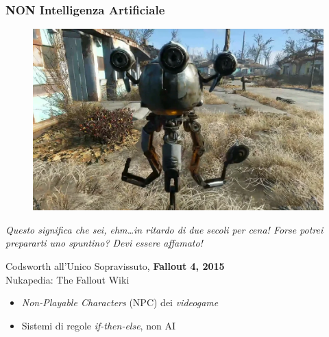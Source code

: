 %
\begin{frame}[t] \frametitle{NON Intelligenza Artificiale}
	\vspace*{-.5cm}
	\begin{center}
		\begin{minipage}[t]{0.6\textwidth}
			\centering
			\begin{figure}[ht]
				\includegraphics[width=\textwidth]{img/codsworth.png}
			\end{figure}
		\end{minipage}
		\begin{minipage}[t]{.6\textwidth}
			\renewcommand{\epigraphsize}{\tiny}
			\setlength{\afterepigraphskip}{0pt}
			\setlength{\beforeepigraphskip}{5pt}
			\setlength{\epigraphwidth}{\textwidth}
			\epigraph{\textit{Questo significa che sei, ehm\ldots in ritardo di due secoli per cena! Forse potrei prepararti uno spuntino? Devi essere affamato!}}{Codsworth all'Unico Sopravissuto, \textbf{Fallout 4, 2015}\\\textcopyright Nukapedia: The Fallout Wiki}
		\end{minipage}
	\end{center}
	\begin{itemize}[leftmargin=10pt,align=right]
		\item[\alert{\faHandORight}] \alert{\textit{Non-Playable Characters}} (NPC) dei \textit{videogame} 
		\onslide<3->\item[\alert{\faHandORight}] Sistemi di regole \textit{if-then-else}, \alert{non} AI
	\end{itemize}
\end{frame}